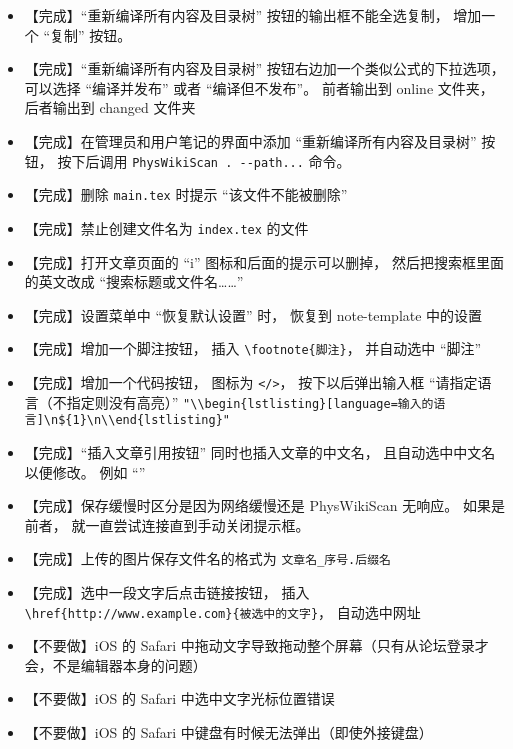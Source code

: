 \begin{itemize}
\item 【完成】“重新编译所有内容及目录树” 按钮的输出框不能全选复制， 增加一个 “复制” 按钮。

\item 【完成】“重新编译所有内容及目录树” 按钮右边加一个类似公式的下拉选项， 可以选择 “编译并发布” 或者 “编译但不发布”。 前者输出到 online 文件夹， 后者输出到 changed 文件夹

\item 【完成】在管理员和用户笔记的界面中添加 “重新编译所有内容及目录树” 按钮， 按下后调用 \lstinline|PhysWikiScan . --path...|  命令。

\item 【完成】删除 \verb`main.tex` 时提示 “该文件不能被删除”

\item 【完成】禁止创建文件名为 \lstinline|index.tex| 的文件

\item 【完成】打开文章页面的 “i” 图标和后面的提示可以删掉， 然后把搜索框里面的英文改成 “搜索标题或文件名……”

\item 【完成】设置菜单中 “恢复默认设置” 时， 恢复到 note-template 中的设置

\item 【完成】增加一个脚注按钮， 插入 \lstinline|\footnote{脚注}|， 并自动选中 “脚注”

\item 【完成】增加一个代码按钮， 图标为 \lstinline|</>|， 按下以后弹出输入框 “请指定语言（不指定则没有高亮）” \verb`"\\begin{lstlisting}[language=输入的语言]\n${1}\n\\end{lstlisting}"`

\item 【完成】“插入文章引用按钮” 同时也插入文章的中文名， 且自动选中中文名以便修改。 例如 “”

\item 【完成】保存缓慢时区分是因为网络缓慢还是 PhysWikiScan 无响应。 如果是前者， 就一直尝试连接直到手动关闭提示框。

\item 【完成】上传的图片保存文件名的格式为 \verb`文章名_序号.后缀名`

\item 【完成】选中一段文字后点击链接按钮， 插入 \lstinline|\href{http://www.example.com}{被选中的文字}|， 自动选中网址

\item 【不要做】iOS 的 Safari 中拖动文字导致拖动整个屏幕（只有从论坛登录才会，不是编辑器本身的问题）

\item 【不要做】iOS 的 Safari 中选中文字光标位置错误

\item 【不要做】iOS 的 Safari 中键盘有时候无法弹出（即使外接键盘）
\end{itemize}

